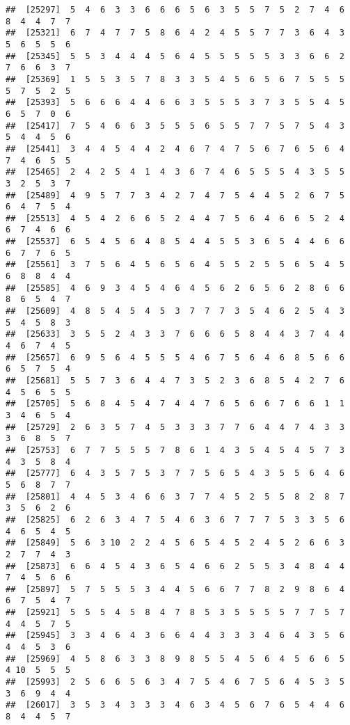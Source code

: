 \documentclass[
]{book}
\begin{document}
\begin{verbatim}
##  [25297]  5  4  6  3  3  6  6  6  5  6  3  5  5  7  5  2  7  4  6  8  4  4  7  7
##  [25321]  6  7  4  7  7  5  8  6  4  2  4  5  5  7  7  3  6  4  3  5  6  5  5  6
##  [25345]  5  5  3  4  4  4  5  6  4  5  5  5  5  5  3  3  6  6  2  7  6  6  3  7
##  [25369]  1  5  5  3  5  7  8  3  3  5  4  5  6  5  6  7  5  5  5  5  7  5  2  5
##  [25393]  5  6  6  6  4  4  6  6  3  5  5  5  3  7  3  5  5  4  5  6  5  7  0  6
##  [25417]  7  5  4  6  6  3  5  5  5  6  5  5  7  7  5  7  5  4  3  5  4  4  5  6
##  [25441]  3  4  4  5  4  4  2  4  6  7  4  7  5  6  7  6  5  6  4  7  4  6  5  5
##  [25465]  2  4  2  5  4  1  4  3  6  7  4  6  5  5  5  4  3  5  5  3  2  5  3  7
##  [25489]  4  9  5  7  7  3  4  2  7  4  7  5  4  4  5  2  6  7  5  6  4  7  5  4
##  [25513]  4  5  4  2  6  6  5  2  4  4  7  5  6  4  6  6  5  2  4  6  7  4  6  6
##  [25537]  6  5  4  5  6  4  8  5  4  4  5  5  3  6  5  4  4  6  6  6  7  7  6  5
##  [25561]  3  7  5  6  4  5  6  5  6  4  5  5  2  5  5  6  5  4  5  6  8  8  4  4
##  [25585]  4  6  9  3  4  5  4  6  4  5  6  2  6  5  6  2  8  6  6  8  6  5  4  7
##  [25609]  4  8  5  4  5  4  5  3  7  7  7  3  5  4  6  2  5  4  3  5  4  5  8  3
##  [25633]  3  5  5  2  4  3  3  7  6  6  6  5  8  4  4  3  7  4  4  4  6  7  4  5
##  [25657]  6  9  5  6  4  5  5  5  4  6  7  5  6  4  6  8  5  6  6  6  5  7  5  4
##  [25681]  5  5  7  3  6  4  4  7  3  5  2  3  6  8  5  4  2  7  6  4  5  6  5  5
##  [25705]  5  6  8  4  5  4  7  4  4  7  6  5  6  6  7  6  6  1  1  3  4  6  5  4
##  [25729]  2  6  3  5  7  4  5  3  3  3  7  7  6  4  4  7  4  3  3  3  6  8  5  7
##  [25753]  6  7  7  5  5  5  7  8  6  1  4  3  5  4  5  4  5  7  3  4  3  5  8  4
##  [25777]  6  4  3  5  7  5  3  7  7  5  6  5  4  3  5  5  6  4  6  5  6  8  7  7
##  [25801]  4  4  5  3  4  6  6  3  7  7  4  5  2  5  5  8  2  8  7  3  5  6  2  6
##  [25825]  6  2  6  3  4  7  5  4  6  3  6  7  7  7  5  3  3  5  6  4  6  5  4  5
##  [25849]  5  6  3 10  2  2  4  5  6  5  4  5  2  4  5  2  6  6  3  2  7  7  4  3
##  [25873]  6  6  4  5  4  3  6  5  4  6  6  2  5  5  3  4  8  4  4  7  4  5  6  6
##  [25897]  5  7  5  5  5  3  4  4  5  6  6  7  7  8  2  9  8  6  4  6  7  5  4  7
##  [25921]  5  5  5  4  5  8  4  7  8  5  3  5  5  5  5  7  7  5  7  4  4  5  7  5
##  [25945]  3  3  4  6  4  3  6  6  4  4  3  3  3  4  6  4  3  5  6  4  4  5  3  6
##  [25969]  4  5  8  6  3  3  8  9  8  5  5  4  5  6  4  5  6  6  5  4 10  5  5  5
##  [25993]  2  5  6  6  5  6  3  4  7  5  4  6  7  5  6  4  5  3  5  3  6  9  4  4
##  [26017]  3  5  3  4  3  3  3  4  6  3  4  5  6  7  6  5  4  4  6  8  4  4  5  7

\end{verbatim}
\end{document}
